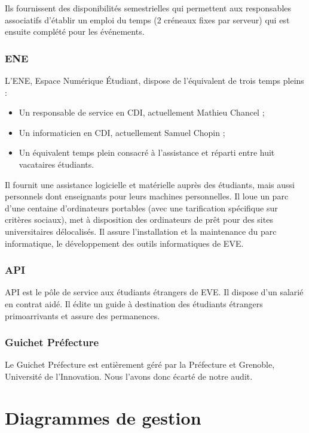 Ils fournissent des disponibilités semestrielles qui permettent aux responsables
associatifs d'établir un emploi du temps (2 créneaux fixes par serveur) qui est
ensuite complété pour les événements.

\subsubsection{ENE}
\label{ene}

L'ENE, Espace Numérique Étudiant, dispose de l'équivalent de trois
temps pleins :
\begin{itemize}
\item Un responsable de service en CDI, actuellement Mathieu Chancel ;
\item Un informaticien en CDI, actuellement Samuel Chopin ;
\item Un équivalent temps plein consacré à l'assistance et réparti
entre huit vacataires étudiants.
\end{itemize}


Il fournit une assistance logicielle et matérielle auprès des étudiants,
mais aussi personnels dont enseignants pour leurs machines personnelles.
Il loue un parc d'une centaine d'ordinateurs portables (avec une tarification
spécifique sur critères sociaux), met à disposition des ordinateurs de prêt pour
des sites universitaires délocalisés. Il assure l'installation et la maintenance
du parc informatique, le développement des outils informatiques de EVE.

\subsubsection{API}
\label{api}

API est le pôle de service aux étudiants étrangers de EVE.
Il dispose d'un salarié en contrat aidé. Il édite un guide à destination des
étudiants étrangers primoarrivants et assure des permanences.

\subsubsection{Guichet Préfecture}

Le Guichet Préfecture est entièrement géré par la Préfecture et Grenoble, Université de l'Innovation.
Nous l'avons donc écarté de notre audit.

\section{Diagrammes de gestion}

